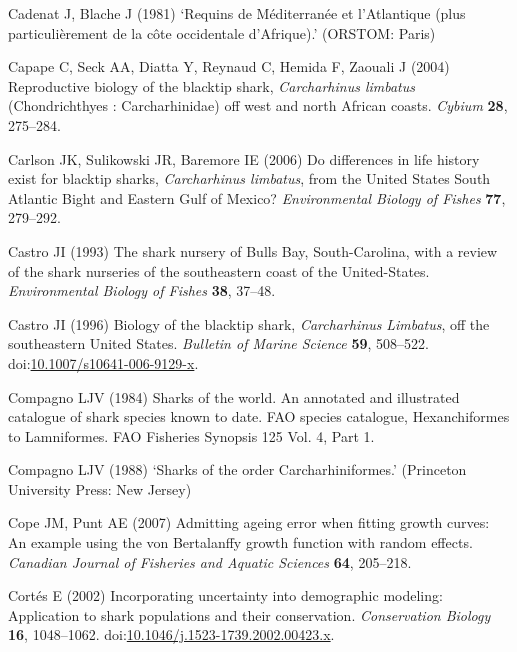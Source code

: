 \documentclass[]{article}
\begin{document}
\leavevmode\hypertarget{ref-cadenat_requins_1981}{}%
Cadenat J, Blache J (1981) `Requins de Méditerranée et l'Atlantique
(plus particulièrement de la côte occidentale d'Afrique).' (ORSTOM:
Paris)

\leavevmode\hypertarget{ref-capape_reproductive_2004}{}%
Capape C, Seck AA, Diatta Y, Reynaud C, Hemida F, Zaouali J (2004)
Reproductive biology of the blacktip shark, \emph{Carcharhinus limbatus}
(Chondrichthyes : Carcharhinidae) off west and north African coasts.
\emph{Cybium} \textbf{28}, 275--284.

\leavevmode\hypertarget{ref-carlson_differences_2006}{}%
Carlson JK, Sulikowski JR, Baremore IE (2006) Do differences in life
history exist for blacktip sharks, \emph{Carcharhinus limbatus}, from
the United States South Atlantic Bight and Eastern Gulf of Mexico?
\emph{Environmental Biology of Fishes} \textbf{77}, 279--292.

\leavevmode\hypertarget{ref-castro_shark_1993}{}%
Castro JI (1993) The shark nursery of Bulls Bay, South-Carolina, with a
review of the shark nurseries of the southeastern coast of the
United-States. \emph{Environmental Biology of Fishes} \textbf{38},
37--48.

\leavevmode\hypertarget{ref-castro_biology_1996}{}%
Castro JI (1996) Biology of the blacktip shark, \emph{Carcharhinus}
\emph{Limbatus}, off the southeastern United States. \emph{Bulletin of
Marine Science} \textbf{59}, 508--522.
doi:\href{https://doi.org/10.1007/s10641-006-9129-x}{10.1007/s10641-006-9129-x}.

\leavevmode\hypertarget{ref-compagno_sharks_1984}{}%
Compagno LJV (1984) Sharks of the world. An annotated and illustrated
catalogue of shark species known to date. FAO species catalogue,
Hexanchiformes to Lamniformes. FAO Fisheries Synopsis 125 Vol. 4, Part
1.

\leavevmode\hypertarget{ref-compagno_sharks_1988}{}%
Compagno LJV (1988) `Sharks of the order Carcharhiniformes.' (Princeton
University Press: New Jersey)

\leavevmode\hypertarget{ref-cope_admitting_2007}{}%
Cope JM, Punt AE (2007) Admitting ageing error when fitting growth
curves: An example using the von Bertalanffy growth function with random
effects. \emph{Canadian Journal of Fisheries and Aquatic Sciences}
\textbf{64}, 205--218.

\leavevmode\hypertarget{ref-cortes_incorporating_2002}{}%
Cortés E (2002) Incorporating uncertainty into demographic modeling:
Application to shark populations and their conservation.
\emph{Conservation Biology} \textbf{16}, 1048--1062.
doi:\href{https://doi.org/10.1046/j.1523-1739.2002.00423.x}{10.1046/j.1523-1739.2002.00423.x}.
\end{document}
